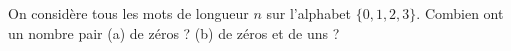 On considère tous les mots de longueur $n$ sur l'alphabet $\{0, 1, 2, 3\}$. Combien ont un nombre pair (a) de zéros ? (b) de zéros et de uns ?
